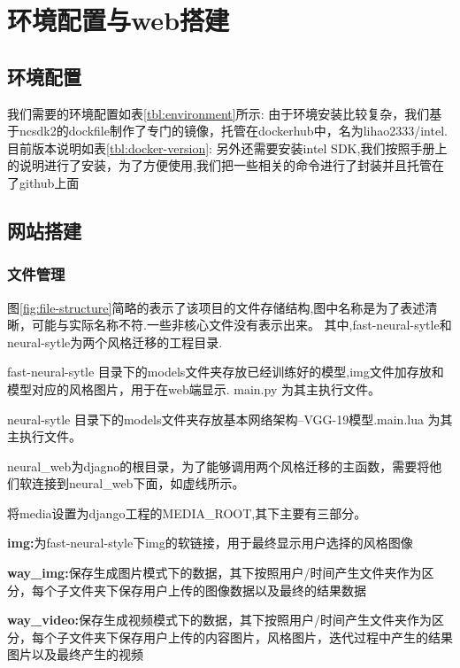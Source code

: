 \section{环境配置与web搭建}
\subsection{环境配置}
我们需要的环境配置如表\ref{tbl:environment}所示:
由于环境安装比较复杂，我们基于ncsdk2的dockfile制作了专门的镜像，托管在dockerhub中，名为lihao2333/intel.
目前版本说明如表\ref{tbl:docker-version}:
另外还需要安装intel SDK,我们按照手册上的说明进行了安装，为了方便使用,我们把一些相关的命令进行了封装并且托管在了github\cite{rcClub}上面
\subsection{网站搭建}
\subsubsection{文件管理}
图\ref{fig:file-structure}简略的表示了该项目的文件存储结构,图中名称是为了表述清晰，可能与实际名称不符.一些非核心文件没有表示出来。
其中,fast-neural-sytle和neural-sytle为两个风格迁移的工程目录.

fast-neural-sytle 目录下的models文件夹存放已经训练好的模型,img文件加存放和模型对应的风格图片，用于在web端显示. main.py 为其主执行文件。

neural-sytle 目录下的models文件夹存放基本网络架构--VGG-19模型.main.lua 为其主执行文件。

neural\_web为djagno的根目录，为了能够调用两个风格迁移的主函数，需要将他们软连接到neural\_web下面，如虚线所示。

将media设置为django工程的MEDIA\_ROOT,其下主要有三部分。
\begin{description}
  \item{\textbf{img:}}为fast-neural-style下img的软链接，用于最终显示用户选择的风格图像
  \item{\textbf{way\_img:}}保存生成图片模式下的数据，其下按照用户/时间产生文件夹作为区分，每个子文件夹下保存用户上传的图像数据以及最终的结果数据
  \item{\textbf{way\_video:}}保存生成视频模式下的数据，其下按照用户/时间产生文件夹作为区分，每个子文件夹下保存用户上传的内容图片，风格图片，迭代过程中产生的结果图片以及最终产生的视频
\end{description}

